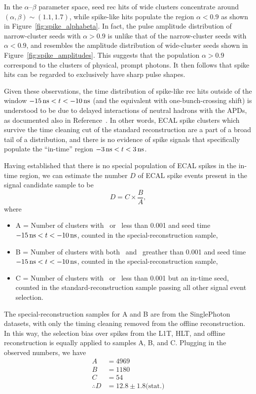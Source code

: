 In the $\alpha$--$\beta$ parameter space, seed rec hits of wide clusters concentrate around $(\alpha, \beta) \sim (1.1, 1.7)$, while spike-like hits populate the region $\alpha < 0.9$ as shown in Figure~\ref{fig:spike_alphabeta}.
In fact, the pulse amplitude distribution of narrow-cluster seeds with $\alpha > 0.9$ is unlike that of the narrow-cluster seeds with $\alpha < 0.9$, and resembles the amplitude distribution of wide-cluster seeds shown in Figure~\ref{fig:spike_amplitudes}.
This suggests that the population $\alpha > 0.9$ correspond to the clusters of physical, prompt photons.
It then follows that spike hits can be regarded to exclusively have sharp pulse shapes.

Given these observations, the time distribution of spike-like rec hits outside of the window $-15\, \text{ns} < t < -10\, \text{ns}$ (and the equivalent with one-bunch-crossing shift) is understood to be due to delayed interactions of neutral hadrons with the APDs, as documented also in Reference~\cite{CMS_AN_2010-357}. 
In other words, ECAL spike clusters which survive the time cleaning cut of the standard reconstruction are a part of a broad tail of a distribution, and there is no evidence of spike signals that specifically populate the ``in-time'' region $-3\, \text{ns} < t < 3\, \text{ns}$.

Having established that there is no special population of ECAL spikes in the in-time region, we can estimate the number $D$ of ECAL spike events present in the signal candidate sample to be
\begin{equation}
  D = C \times \frac{B}{A},
\end{equation}
where
\begin{itemize}
  \item A = Number of clusters with \sieie\ or \sipip\ less than 0.001 and seed time $-15\, \text{ns} < t < -10\, \text{ns}$, counted in the special-reconstruction sample,
  \item B = Number of clusters with both \sieie\ and \sipip\ greather than 0.001 and seed time $-15\, \text{ns} < t < -10\, \text{ns}$, counted in the special-reconstruction sample, 
  \item C = Number of clusters with \sieie\ or \sipip\ less than 0.001 but an in-time seed, counted in the standard-reconstruction sample passing all other signal event selection.
\end{itemize}

The special-reconstruction samples for A and B are from the SinglePhoton datasets, with only the timing cleaning removed from the offline reconstruction.
In this way, the selection bias over spikes from the L1T, HLT, and offline reconstruction is equally applied to samples A, B, and C. Plugging in the observed numbers, we have
\begin{align*}
  A & = 4969 \\
  B & = 1180 \\
  C & = 54 \\
  \therefore D & = 12.8 \pm 1.8 \text{(stat.)}
\end{align*}

